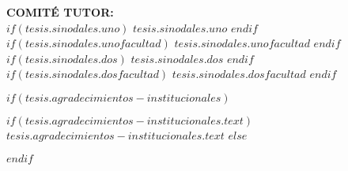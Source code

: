 \begin{titlepage}
\begin{center}
        {\small \textbf{COMITÉ TUTOR:}}\\
        {\small $if(tesis.sinodales.uno)$ $tesis.sinodales.uno$ $endif$}\\
        {\small $if(tesis.sinodales.unofacultad)$ $tesis.sinodales.unofacultad$ $endif$}\\[0.3cm]
        {\small $if(tesis.sinodales.dos)$ $tesis.sinodales.dos$ $endif$}\\
        {\small $if(tesis.sinodales.dosfacultad)$ $tesis.sinodales.dosfacultad$ $endif$}\\[1cm]
        
        
    \end{center}
\end{titlepage}


\newpage
\begin{center}
\end{center}

\newpage
\begin{center}
\end{center}

$if(tesis.agradecimientos-institucionales)$

\begin{acknowledgements}
\addchaptertocentry{\acknowledgementname} %


$if(tesis.agradecimientos-institucionales.text)$
$tesis.agradecimientos-institucionales.text$
$else$

$endif$
\end{acknowledgements}

